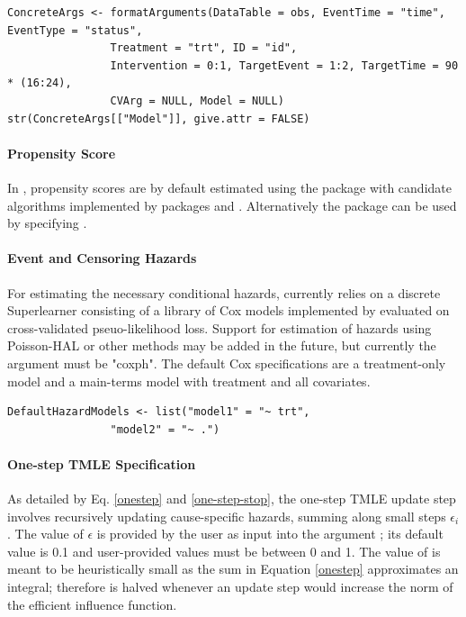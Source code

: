 \documentclass{report}
\newcommand{\1}{\ensuremath{\mathbf{1}}}
\begin{document}
\begin{lstlisting}
ConcreteArgs <- formatArguments(DataTable = obs, EventTime = "time", EventType = "status", 
				Treatment = "trt", ID = "id", 
				Intervention = 0:1, TargetEvent = 1:2, TargetTime = 90 * (16:24), 
				CVArg = NULL, Model = NULL)
str(ConcreteArgs[["Model"]], give.attr = FALSE)
\end{lstlisting}

\paragraph{Propensity Score}
\label{PropScore}
In , propensity scores are by default estimated using the 
package  with candidate algorithms  implemented by packages  and . Alternatively the  package can be used by specifying .

\paragraph{Event and Censoring Hazards}
\label{HazardEstimation}
For estimating the necessary conditional hazards,  currently relies on a discrete Superlearner consisting of a library of Cox models implemented by  evaluated on cross-validated pseuo-likelihood loss. Support for estimation of hazards using Poisson-HAL or other methods may be added in the future, but currently the  argument must be "coxph". The default Cox specifications are a treatment-only model and a main-terms model with treatment and all covariates.  

\begin{lstlisting}
DefaultHazardModels <- list("model1" = "~ trt", 
			    "model2" = "~ .")
\end{lstlisting}

\paragraph{One-step TMLE Specification}
\label{tmle-specification}
As detailed by Eq. \eqref{onestep} and \eqref{one-step-stop}, the one-step TMLE update step involves recursively updating cause-specific hazards, summing along small steps \(\epsilon_i\). The value of \(\epsilon\) is provided by the user as input into the argument ; its default value is 0.1 and user-provided values must be between 0 and 1. The value of  is meant to be heuristically small as the sum in Equation \eqref{onestep} approximates an integral; therefore  is halved whenever an update step would increase the norm of the efficient influence function.
\end{document}
